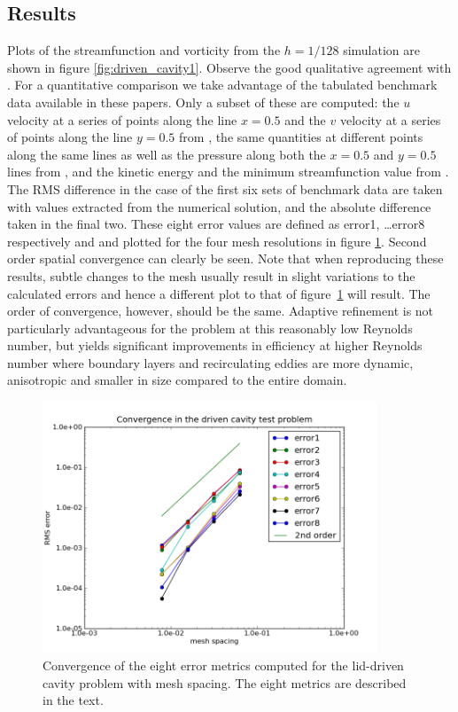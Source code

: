 \subsection{Results}
Plots of the streamfunction and vorticity from the $h=1/128$ simulation are shown in figure \ref{fig:driven_cavity1}.
Observe the good qualitative agreement with \citep{botella1998,erturk2005,bruneau2006}. 
For a quantitative comparison we take advantage of the tabulated benchmark data available in these papers.
Only a subset of these are computed: the $u$ velocity at a series of points along the line $x=0.5$ and the
$v$ velocity at a series of points along the line $y=0.5$ from \citep{erturk2005}, the same quantities at
different points along the same lines as well as the pressure along both the $x=0.5$ and $y=0.5$ lines from 
\citep{botella1998}, and the kinetic energy and the minimum streamfunction value from \citep{bruneau2006}.
The RMS difference in the case of the first six sets of benchmark data are taken with values extracted from 
the numerical solution, and the absolute difference taken in the final two. These eight error values are
defined as error1, \ldots error8 respectively and and plotted for the four mesh resolutions in figure 
\ref{fig:driven_cavity2}.
Second order spatial convergence can clearly be seen.
Note that when reproducing these results, subtle changes to the mesh usually result in slight variations to the calculated errors and hence a different plot to that of figure~\ref{fig:driven_cavity2} will result. The order of convergence, however, should be the same.
Adaptive refinement is not particularly advantageous for the problem at this reasonably low Reynolds number, but
yields significant improvements in efficiency at higher Reynolds number where boundary layers and
recirculating eddies are more dynamic, anisotropic and smaller in size compared to the entire domain.

\begin{figure}
\centering
\includegraphics[width=10cm,clip]{examples_images/driven_cavity/driven_cavity_error_plot.png}
\caption{Convergence of the eight error metrics computed for the lid-driven cavity problem with mesh spacing. The eight
metrics are described in the text.}
\label{fig:driven_cavity2}
\end{figure}

